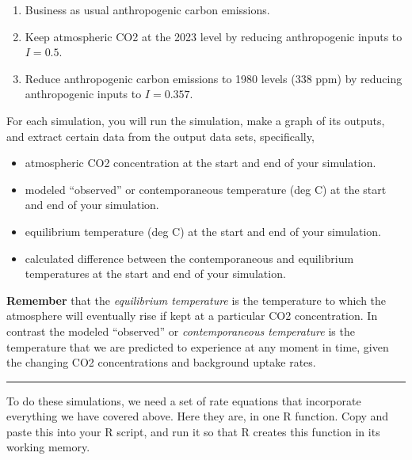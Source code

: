 \documentclass[
  letterpaper,
  DIV=11,
  numbers=noendperiod]{scrreprt}
\providecommand{\tightlist}{%
  \setlength{\itemsep}{0pt}\setlength{\parskip}{0pt}}
\begin{document}
\begin{enumerate}
\def\labelenumi{\arabic{enumi}.}
\tightlist
\item
  Business as usual anthropogenic carbon emissions.
\item
  Keep atmospheric CO2 at the 2023 level by reducing anthropogenic
  inputs to \(I=0.5\).
\item
  Reduce anthropogenic carbon emissions to 1980 levels (338 ppm) by
  reducing anthropogenic inputs to \(I=0.357\).
\end{enumerate}

For each simulation, you will run the simulation, make a graph of its
outputs, and extract certain data from the output data sets,
specifically,

\begin{itemize}
\tightlist
\item
  atmospheric CO2 concentration at the start and end of your simulation.
\item
  modeled ``observed'' or contemporaneous temperature (deg C) at the
  start and end of your simulation.
\item
  equilibrium temperature (deg C) at the start and end of your
  simulation.
\item
  calculated difference between the contemporaneous and equilibrium
  temperatures at the start and end of your simulation.
\end{itemize}

\textbf{Remember} that the \emph{equilibrium temperature} is the
temperature to which the atmosphere will eventually rise if kept at a
particular CO2 concentration. In contrast the modeled ``observed'' or
\emph{contemporaneous temperature} is the temperature that we are
predicted to experience at any moment in time, given the changing CO2
concentrations and background uptake rates.

\begin{center}\rule{0.5\linewidth}{0.5pt}\end{center}

To do these simulations, we need a set of rate equations that
incorporate everything we have covered above. Here they are, in one R
function. Copy and paste this into your R script, and run it so that R
creates this function in its working memory.
\end{document}
